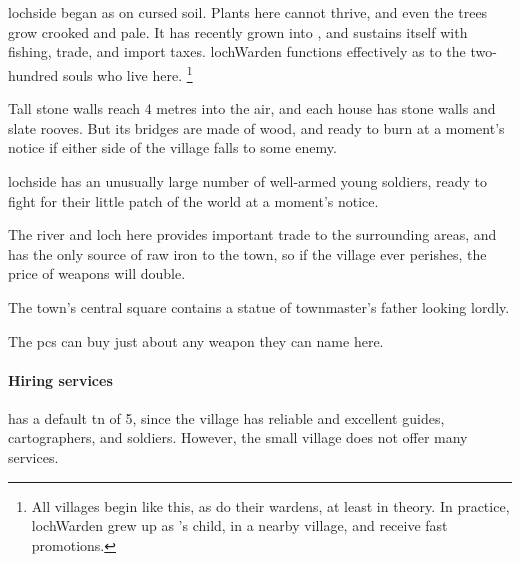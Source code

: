 

\section[\Glsfmttext{lochside}]{~~}
\label{lochside}

\begin{multicols}{2}

\begin{exampletext}
  \noindent
  \Gls{lochside} began as  on cursed soil.
  Plants here cannot thrive, and even the trees grow crooked and pale.
  It has recently grown into , and sustains itself with fishing, trade, and import taxes.
  \Gls{lochWarden} functions effectively as  to the two-hundred souls who live here.%
  \footnote{All \glspl{village} begin like this, as do their \glspl{warden}, at least in theory.
  In practice, \gls{lochWarden} grew up as 's child, in a nearby \gls{village}, and receive fast promotions.}
\end{exampletext}

Tall stone walls reach 4 metres into the air, and each house has stone walls and slate rooves.
But its bridges are made of wood, and ready to burn at a moment's notice if either side of the \gls{village} falls to some enemy.

\Gls{lochside} has an unusually large number of well-armed young soldiers, ready to fight for their little patch of the world at a moment's notice.

The river and loch here provides important trade to the surrounding areas, and has the only source of raw iron to the town, so if the \gls{village} ever perishes, the price of weapons will double.


The town's central square contains a statue of \gls{townmaster}'s father looking lordly.


The \glspl{pc} can buy just about any weapon they can name here.

\paragraph{Hiring services}
has a default \gls{tn} of 5, since the \gls{village} has reliable and excellent guides, cartographers, and soldiers.
However, the small \gls{village} does not offer many services.


\end{multicols}
